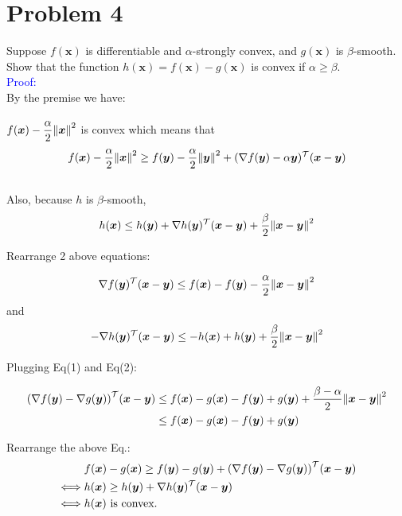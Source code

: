 \documentclass{article}
\def\Trsp#1{#1^{\mathcal{T}}}
\def\bx{\boldsymbol{x}}
\def\by{\boldsymbol{y}}
\def\Eproof{\textcolor{blue}{Proof: }}
\begin{document}
\section*{Problem 4}
Suppose $f(\bx)$ is differentiable and $\alpha$-strongly convex, and $g(\bx)$ is $\beta$-smooth. Show that the function $h(\bx) = f(\bx)-g(\bx)$ is convex if $\alpha \ge \beta$.
\\

\Eproof
\\
By the premise we have:
\\
\\
$f(\bx)-\dfrac{\alpha}{2}\norm{\bx}^2$ is convex which means that 
$$f(\bx)-\dfrac{\alpha}{2}\norm{\bx}^2 \ge f(\by)-\dfrac{\alpha}{2}\norm{\by}^2 + \Trsp{(\nabla f(\by)-\alpha\by)}(\bx-\by)$$
\\
Also, because $h$ is $\beta$-smooth,
$$
h(\bx)\le h(\by)+\nabla h(\by)^{\mathcal{T}}(\bx-\by)+\dfrac{\beta}{2}\norm{\bx-\by}^2
$$

Rearrange 2 above equations:

\begin{equation}
	\nabla f(\by)^{\mathcal{T}}(\bx-\by)
	\le
	f(\bx)-f(\by)-\frac{\alpha}{2}\norm{\bx-\by}^2
\end{equation}
and
\begin{equation}
-\nabla h(\by)^{\mathcal{T}}(\bx-\by)
\le
-h(\bx)+h(\by)+\dfrac{\beta}{2}\norm{\bx-\by}^2
\end{equation}

Plugging Eq(1) and Eq(2):

$$
\begin{aligned}
	\qty(\nabla f(\by)-\nabla g(\by))^{\mathcal{T}}(\bx-\by)
	&\le
	f(\bx)-g(\bx)-f(\by)+g(\by)+\dfrac{\beta-\alpha}{2}\norm{\bx-\by}^2
	\\
	&\le
	f(\bx)-g(\bx)-f(\by)+g(\by)
\end{aligned}
$$

Rearrange the above Eq.:
$$
\begin{aligned}
	&
	f(\bx)-g(\bx)\ge f(\by)-g(\by)+\qty(\nabla f(\by)-\nabla g(\by))^{\mathcal{T}}(\bx-\by)
	\\
	\iff
	&
	h(\bx)\ge h(\by)+\nabla h(\by)^{\mathcal{T}}(\bx-\by)
	\\
	\iff
	&
	h(\bx) \mbox{ is convex.}
\end{aligned}
$$
\end{document}
